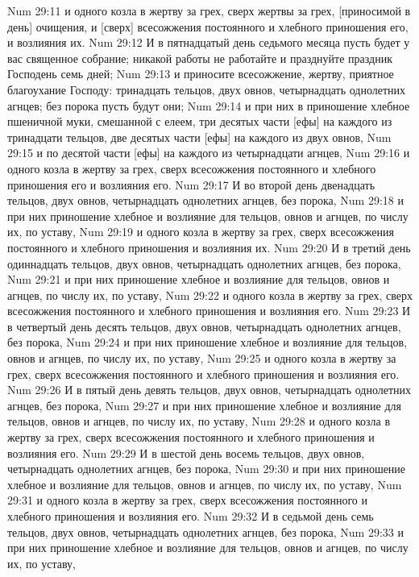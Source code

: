 Num 29:11  и одного козла в жертву за грех, сверх жертвы за грех, [приносимой в день] очищения, и [сверх] всесожжения постоянного и хлебного приношения его, и возлияния их.
Num 29:12  И в пятнадцатый день седьмого месяца пусть будет у вас священное собрание; никакой работы не работайте и празднуйте праздник Господень семь дней;
Num 29:13  и приносите всесожжение, жертву, приятное благоухание Господу: тринадцать тельцов, двух овнов, четырнадцать однолетних агнцев; без порока пусть будут они;
Num 29:14  и при них в приношение хлебное пшеничной муки, смешанной с елеем, три десятых части [ефы] на каждого из тринадцати тельцов, две десятых части [ефы] на каждого из двух овнов,
Num 29:15  и по десятой части [ефы] на каждого из четырнадцати агнцев,
Num 29:16  и одного козла в жертву за грех, сверх всесожжения постоянного и хлебного приношения его и возлияния его.
Num 29:17  И во второй день двенадцать тельцов, двух овнов, четырнадцать однолетних агнцев, без порока,
Num 29:18  и при них приношение хлебное и возлияние для тельцов, овнов и агнцев, по числу их, по уставу,
Num 29:19  и одного козла в жертву за грех, сверх всесожжения постоянного и хлебного приношения и возлияния их.
Num 29:20  И в третий день одиннадцать тельцов, двух овнов, четырнадцать однолетних агнцев, без порока,
Num 29:21  и при них приношение хлебное и возлияние для тельцов, овнов и агнцев, по числу их, по уставу,
Num 29:22  и одного козла в жертву за грех, сверх всесожжения постоянного и хлебного приношения и возлияния его.
Num 29:23  И в четвертый день десять тельцов, двух овнов, четырнадцать однолетних агнцев, без порока,
Num 29:24  и при них приношение хлебное и возлияние для тельцов, овнов и агнцев, по числу их, по уставу,
Num 29:25  и одного козла в жертву за грех, сверх всесожжения постоянного и хлебного приношения и возлияния его.
Num 29:26  И в пятый день девять тельцов, двух овнов, четырнадцать однолетних агнцев, без порока,
Num 29:27  и при них приношение хлебное и возлияние для тельцов, овнов и агнцев, по числу их, по уставу,
Num 29:28  и одного козла в жертву за грех, сверх всесожжения постоянного и хлебного приношения и возлияния его.
Num 29:29  И в шестой день восемь тельцов, двух овнов, четырнадцать однолетних агнцев, без порока,
Num 29:30  и при них приношение хлебное и возлияние для тельцов, овнов и агнцев, по числу их, по уставу,
Num 29:31  и одного козла в жертву за грех, сверх всесожжения постоянного и хлебного приношения и возлияния его.
Num 29:32  И в седьмой день семь тельцов, двух овнов, четырнадцать однолетних агнцев, без порока,
Num 29:33  и при них приношение хлебное и возлияние для тельцов, овнов и агнцев, по числу их, по уставу,
